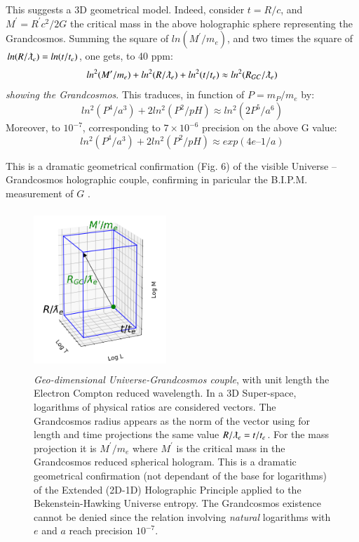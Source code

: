 \documentclass[twoside,draft]{article}
\begin{document}
\begin{sloppypar}
This suggests a 3D geometrical model. Indeed, consider $t =R/c$, and $M^{\prime} = R^{\prime} c^{2} /2G$ the critical mass in the above holographic sphere representing the Grandcosmos. Summing the square of $ln(M^{\prime}/m_{e} )$, and two times the square of $ln(R/\lambdabar_{e} ) = ln(t/t_{e} )$, one gets, to 40 ppm:
\begin{equation}
ln^{2} (M^{\prime}/m_{e} ) + ln^{2} (R/\lambdabar_{e}) + ln^2 (t/t_{e} ) \approx ln^2 (R_{GC} /\lambdabar_{e} )
\end{equation} 
\textit{showing the Grandcosmos}. This traduces, in function of $P = m_P/m_e$ by:
\begin{equation}
ln^2(P^4/a^3) + 2 ln^2(P^2/pH) \approx ln^2(2P^5/a^6)
\end{equation}
Moreover, to $10^{-7}$, corresponding to $7 \times 10^{-6}$ precision on the above G value:
\begin{equation}
ln^2(P^4/a^3) + 2 ln^2(P^2/pH) \approx exp(4e – 1/a)
\end{equation}
 
This is a dramatic geometrical confirmation (Fig. 6) of the visible Universe – Grandcosmos holographic couple, confirming in paricular the B.I.P.M. measurement of $G$ \cite{Quinn}.


\begin{figure}[h]
\centering
\includegraphics[width=5cm,height=6cm]{./figures/triaxis.png}
\caption {\textit{Geo-dimensional Universe-Grandcosmos couple}, with unit length the Electron Compton reduced wavelength. 
In a 3D Super-space, logarithms of physical ratios are considered vectors. The Grandcosmos radius appears as the norm of the vector using for length and time projections the same value $R/\lambdabar_e = t/t_e$. For the mass projection it is $M^{\prime}/m_e$ where
$M^{\prime}$ is the critical mass in the Grandcosmos reduced spherical hologram. This is a dramatic geometrical confirmation (not dependant of the base for logarithms) of the Extended (2D-1D) Holographic Principle applied to the Bekenstein-Hawking Universe entropy. The Grandcosmos existence cannot be denied since the relation involving \textit{natural} logarithms with $e$ and $a$ reach precision $10^{-7}$.} 
\end{figure}


\end{sloppypar}
\end{document}
